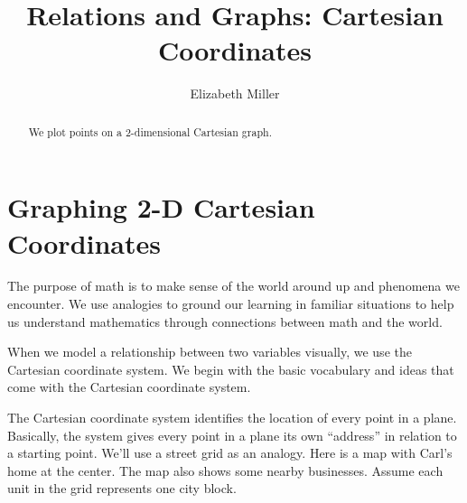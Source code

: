 \documentclass{ximera}
\author{Elizabeth Miller}
\title{Relations and Graphs: Cartesian Coordinates}
\begin{document}
\begin{abstract}
We plot points on a 2-dimensional Cartesian graph.  
\end{abstract}
\maketitle


\section{Graphing 2-D Cartesian Coordinates} 

\begin{MM}
The purpose of math is to make sense of the world around up and phenomena we encounter. We use analogies to ground our learning in familiar situations to help us understand mathematics through connections between math and the world.



\end{MM}

When we model a relationship between two variables visually, we use the Cartesian coordinate system. We begin with the basic vocabulary and ideas that come with the Cartesian coordinate system.

The Cartesian coordinate system identifies the location of every point in a plane. Basically, the system gives every point in a plane its own ``address'' in relation to a starting point. We'll use a street grid as an analogy. Here is a map with Carl's home at the center. The map also shows some nearby businesses. Assume each unit in the grid represents one city block.

\begin{image}
\end{image}
\end{document}
